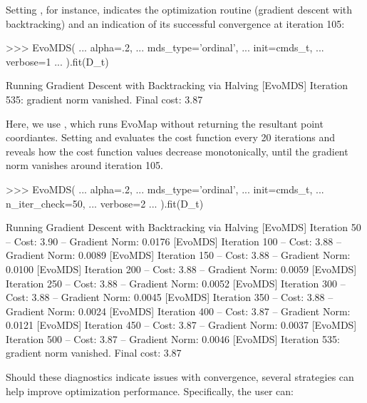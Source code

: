 \documentclass[article]{jss}
\begin{document}
Setting , for instance, indicates the optimization routine (gradient descent with backtracking)
and an indication of its successful convergence at iteration 105:

\begin{CodeChunk}
\begin{CodeInput}
>>> EvoMDS(
...   alpha=.2,
...   mds_type='ordinal',
...   init=cmds_t,
...   verbose=1
... ).fit(D_t)    
\end{CodeInput}
\begin{CodeOutput}
[EvoMDS] Running Gradient Descent with Backtracking via Halving
[EvoMDS] Iteration 535: gradient norm vanished. Final cost: 3.87
\end{CodeOutput}
\end{CodeChunk}

Here, we use , which runs EvoMap without returning the resultant point coordiantes. 
Setting  and  evaluates the cost function every 20 iterations and reveals 
how the cost function values decrease monotonically, until the gradient norm vanishes around iteration 105.

\begin{CodeChunk}
\begin{CodeInput}
>>> EvoMDS(
...     alpha=.2,
...     mds_type='ordinal',
...     init=cmds_t,
...     n_iter_check=50,
...     verbose=2
... ).fit(D_t)    
\end{CodeInput}
\begin{CodeOutput}
[EvoMDS] Running Gradient Descent with Backtracking via Halving
[EvoMDS] Iteration 50 -- Cost: 3.90 -- Gradient Norm: 0.0176
[EvoMDS] Iteration 100 -- Cost: 3.88 -- Gradient Norm: 0.0089
[EvoMDS] Iteration 150 -- Cost: 3.88 -- Gradient Norm: 0.0100
[EvoMDS] Iteration 200 -- Cost: 3.88 -- Gradient Norm: 0.0059
[EvoMDS] Iteration 250 -- Cost: 3.88 -- Gradient Norm: 0.0052
[EvoMDS] Iteration 300 -- Cost: 3.88 -- Gradient Norm: 0.0045
[EvoMDS] Iteration 350 -- Cost: 3.88 -- Gradient Norm: 0.0024
[EvoMDS] Iteration 400 -- Cost: 3.87 -- Gradient Norm: 0.0121
[EvoMDS] Iteration 450 -- Cost: 3.87 -- Gradient Norm: 0.0037
[EvoMDS] Iteration 500 -- Cost: 3.87 -- Gradient Norm: 0.0046
[EvoMDS] Iteration 535: gradient norm vanished. Final cost: 3.87
\end{CodeOutput}
\end{CodeChunk}

Should these diagnostics indicate issues with convergence, several strategies can help improve optimization performance.
Specifically, the user can:
\end{document}

